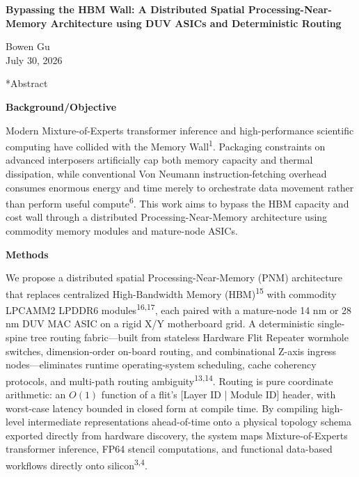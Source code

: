 \documentclass[12pt]{article}
\makeatletter
\renewcommand\section{\@startsection{section}{1}{\z@}{-1.2ex \@plus -0.2ex}{0.4ex}{\normalsize\bfseries}}
\makeatother
\begin{document}
\begin{center}
{\Large\bfseries Bypassing the HBM Wall: A Distributed Spatial Processing-Near-Memory Architecture using DUV ASICs and Deterministic Routing}
\end{center}
\vspace{0.75em}
\begin{center}
Bowen Gu \\
July 30, 2026
\end{center}

\vspace{1em}

\section*{Abstract}

\textbf{Background/Objective}

Modern Mixture-of-Experts transformer inference and high-performance scientific computing have collided with the Memory Wall\textsuperscript{1}. Packaging constraints on advanced interposers artificially cap both memory capacity and thermal dissipation, while conventional Von Neumann instruction-fetching overhead consumes enormous energy and time merely to orchestrate data movement rather than perform useful compute\textsuperscript{6}. This work aims to bypass the HBM capacity and cost wall through a distributed Processing-Near-Memory architecture using commodity memory modules and mature-node ASICs.

\textbf{Methods}

We propose a distributed spatial Processing-Near-Memory (PNM) architecture that replaces centralized High-Bandwidth Memory (HBM)\textsuperscript{15} with commodity LPCAMM2 LPDDR6 modules\textsuperscript{16,17}, each paired with a mature-node 14 nm or 28 nm DUV MAC ASIC on a rigid X/Y motherboard grid. A deterministic single-spine tree routing fabric---built from stateless Hardware Flit Repeater wormhole switches, dimension-order on-board routing, and combinational Z-axis ingress nodes---eliminates runtime operating-system scheduling, cache coherency protocols, and multi-path routing ambiguity\textsuperscript{13,14}. Routing is pure coordinate arithmetic: an $O(1)$ function of a flit's [Layer ID | Module ID] header, with worst-case latency bounded in closed form at compile time. By compiling high-level intermediate representations ahead-of-time onto a physical topology schema exported directly from hardware discovery, the system maps Mixture-of-Experts transformer inference, FP64 stencil computations, and functional data-based workflows directly onto silicon\textsuperscript{3,4}.
\end{document}
